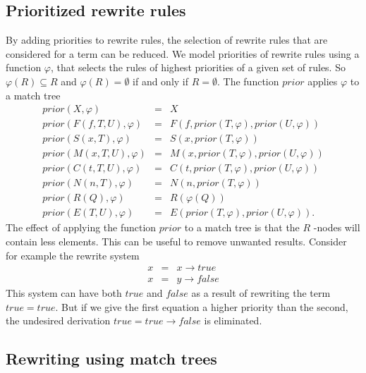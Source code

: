 \documentclass{article}
\begin{document}
\subsection{Prioritized rewrite rules}

By adding priorities to rewrite rules, the selection of rewrite rules that
are considered for a term can be reduced. We model priorities of rewrite
rules using a function $\varphi $, that selects the rules of highest
priorities of a given set of rules. So $\varphi (R)\subseteq R$ and $\varphi
(R)=\emptyset $ if and only if $R=\emptyset $. The function $prior$ applies $%
\varphi $ to a match tree%
\begin{equation*}
\begin{array}{lll}
prior(X,\varphi ) & = & X \\ 
prior(F(f,T,U),\varphi ) & = & F(f,prior(T,\varphi ),prior(U,\varphi )) \\ 
prior(S(x,T),\varphi ) & = & S(x,prior(T,\varphi )) \\ 
prior(M(x,T,U),\varphi ) & = & M(x,prior(T,\varphi ),prior(U,\varphi )) \\ 
prior(C(t,T,U),\varphi ) & = & C(t,prior(T,\varphi ),prior(U,\varphi )) \\ 
prior(N(n,T),\varphi ) & = & N(n,prior(T,\varphi )) \\ 
prior(R(Q),\varphi ) & = & R(\varphi (Q)) \\ 
prior(E(T,U),\varphi ) & = & E(prior(T,\varphi ),prior(U,\varphi )).%
\end{array}%
\end{equation*}%
The effect of applying the function $prior$ to a match tree is that the $R$%
-nodes will contain less elements.  This can be useful to remove unwanted
results. Consider for example the rewrite system%
\begin{eqnarray*}
x &=&x\rightarrow true \\
x &=&y\rightarrow false
\end{eqnarray*}%
This system can have both $true$ and $false$ as a result of rewriting the
term $true=true$. But if we give the first equation a higher priority than
the second, the undesired derivation $true=true\rightarrow false$ is
eliminated.

\subsection{Rewriting using match trees}
\end{document}
